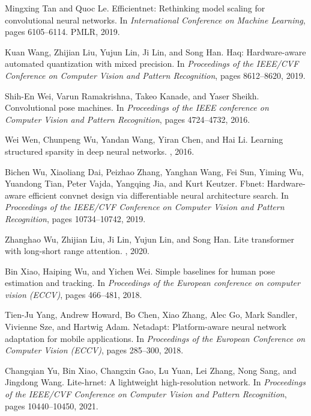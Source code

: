 \documentclass[10pt,twocolumn,letterpaper]{article}
\begin{document}
{\begin{thebibliography}{10}
Mingxing Tan and Quoc Le.
\newblock Efficientnet: Rethinking model scaling for convolutional neural
  networks.
\newblock In {\em International Conference on Machine Learning}, pages
  6105--6114. PMLR, 2019.

Kuan Wang, Zhijian Liu, Yujun Lin, Ji Lin, and Song Han.
\newblock Haq: Hardware-aware automated quantization with mixed precision.
\newblock In {\em Proceedings of the IEEE/CVF Conference on Computer Vision and
  Pattern Recognition}, pages 8612--8620, 2019.

Shih-En Wei, Varun Ramakrishna, Takeo Kanade, and Yaser Sheikh.
\newblock Convolutional pose machines.
\newblock In {\em Proceedings of the IEEE conference on Computer Vision and
  Pattern Recognition}, pages 4724--4732, 2016.

Wei Wen, Chunpeng Wu, Yandan Wang, Yiran Chen, and Hai Li.
\newblock Learning structured sparsity in deep neural networks.
, 2016.

Bichen Wu, Xiaoliang Dai, Peizhao Zhang, Yanghan Wang, Fei Sun, Yiming Wu,
  Yuandong Tian, Peter Vajda, Yangqing Jia, and Kurt Keutzer.
\newblock Fbnet: Hardware-aware efficient convnet design via differentiable
  neural architecture search.
\newblock In {\em Proceedings of the IEEE/CVF Conference on Computer Vision and
  Pattern Recognition}, pages 10734--10742, 2019.

Zhanghao Wu, Zhijian Liu, Ji Lin, Yujun Lin, and Song Han.
\newblock Lite transformer with long-short range attention.
, 2020.

Bin Xiao, Haiping Wu, and Yichen Wei.
\newblock Simple baselines for human pose estimation and tracking.
\newblock In {\em Proceedings of the European conference on computer vision
  (ECCV)}, pages 466--481, 2018.

Tien-Ju Yang, Andrew Howard, Bo Chen, Xiao Zhang, Alec Go, Mark Sandler,
  Vivienne Sze, and Hartwig Adam.
\newblock Netadapt: Platform-aware neural network adaptation for mobile
  applications.
\newblock In {\em Proceedings of the European Conference on Computer Vision
  (ECCV)}, pages 285--300, 2018.

Changqian Yu, Bin Xiao, Changxin Gao, Lu Yuan, Lei Zhang, Nong Sang, and
  Jingdong Wang.
\newblock Lite-hrnet: A lightweight high-resolution network.
\newblock In {\em Proceedings of the IEEE/CVF Conference on Computer Vision and
  Pattern Recognition}, pages 10440--10450, 2021.


\end{thebibliography}}
\end{document}
